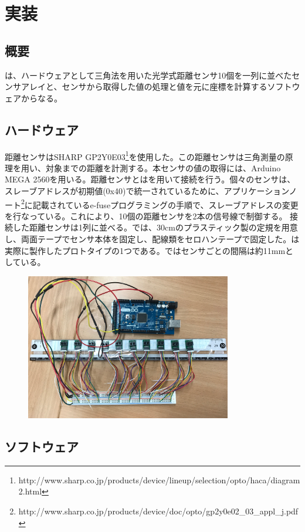 \chapter{実装}
\section{概要}
\SysName は、ハードウェアとして三角法を用いた光学式距離センサ10個を一列に並べたセンサアレイと、センサから取得した値の処理と値を元に座標を計算するソフトウェアからなる。
\section{ハードウェア}
距離センサはSHARP GP2Y0E03\footnote{http://www.sharp.co.jp/products/device/lineup/selection/opto/haca/diagram2.html}を使用した。この距離センサは三角測量の原理を用い、対象までの距離を計測する。本センサの値の取得には、Arduino MEGA 2560を用いる。距離センサとは\iic を用いて接続を行う。個々のセンサは、スレーブアドレスが初期値(0x40)で統一されているために、アプリケーションノート\footnote{http://www.sharp.co.jp/products/device/doc/opto/gp2y0e02\_03\_appl\_j.pdf}に記載されているe-fuseプログラミングの手順で、スレーブアドレスの変更を行なっている。これにより、10個の距離センサを2本の信号線で制御する。
接続した距離センサは1列に並べる。\SysName では、30cmのプラスティック製の定規を用意し、両面テープでセンサ本体を固定し、配線類をセロハンテープで固定した。は実際に製作したプロトタイプの1つである。ではセンサごとの間隔は約11\si{mm}としている。
\begin{figure}[htbp]
	\begin{center}
		\includegraphics[width = 90mm]{./img/IMG_1794.jpg}
	\end{center}
	\caption{}
	\label{img:ig1}
\end{figure}
\section{ソフトウェア} 


